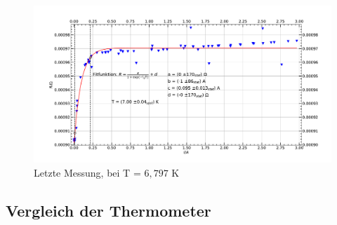 \documentclass[german,  %
parskip=full,  %
]{scrartcl}
\begin{document}
\\\\
\begin{figure}[h!]
\centering
\includegraphics[width=\textwidth]{letzte_Messung.pdf}
\caption{Letzte Messung, bei T = $6,797$ K}
\end{figure}
\newpage

\subsection{Vergleich der Thermometer}
%
%
%
%
%
%
%
%
%
%
%
%
%
%
%
%
\end{document}
